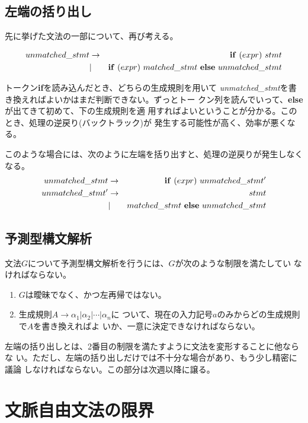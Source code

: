 \documentclass[a4j,11pt]{jsarticle}
\begin{document}
\subsection{左端の括り出し}

先に挙げた文法の一部について、再び考える。

\begin{eqnarray*}
  unmatched\_stmt & \rightarrow & {\bf if}\ (expr)\ stmt \\
                 & |           & {\bf if}\ (expr)\ matched\_stmt\ {\bf
		  else}\ unmatched\_stmt
\end{eqnarray*}

トークン{\bfseries if}を読み込んだとき、どちらの生成規則を用いて
{\itshape unmatched\_stmt}を書き換えればよいかはまだ判断できない。ずっとトー
クン列を読んでいって、{\bfseries else}が出てきて初めて、下の生成規則を適
用すればよいということが分かる。このとき、処理の逆戻り(バックトラック)が
発生する可能性が高く、効率が悪くなる。

このような場合には、次のように左端を括り出すと、処理の逆戻りが発生しなく
なる。
\begin{eqnarray*}
 unmatched\_stmt & \rightarrow & {\bf if}\ (expr)\ unmatched\_stmt' \\
 unmatched\_stmt' & \rightarrow & stmt \\
                  & |           & matched\_stmt\ {\bf else}\ unmatched\_stmt
\end{eqnarray*}

\subsection{予測型構文解析}

文法$G$について予測型構文解析を行うには、$G$が次のような制限を満たしてい
なければならない。
\begin{enumerate}
 \item $G$は曖昧でなく、かつ左再帰ではない。
 \item 生成規則$A \rightarrow \alpha_1 | \alpha_2 | \cdots | \alpha_n $に
       ついて、現在の入力記号$a$のみからどの生成規則で$A$を書き換えればよ
       いか、一意に決定できなければならない。
\end{enumerate}
左端の括り出しとは、2番目の制限を満たすように文法を変形することに他ならな
い。ただし、左端の括り出しだけでは不十分な場合があり、もう少し精密に議論
しなければならない。この部分は次週以降に譲る。

\section{文脈自由文法の限界}
\end{document}
